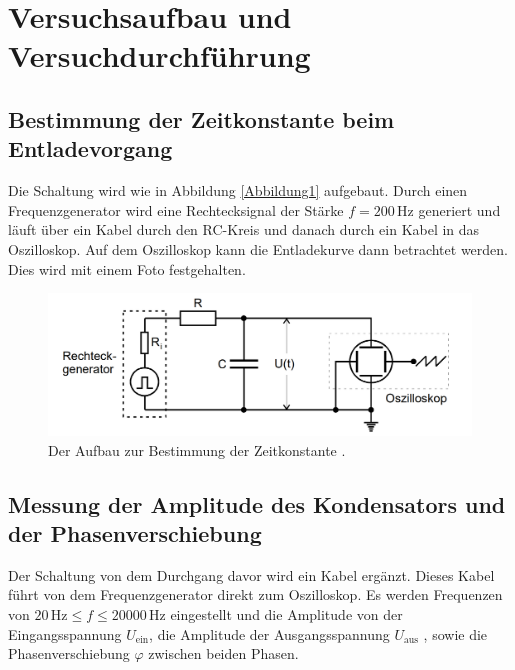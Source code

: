 \section{Versuchsaufbau und Versuchdurchführung}

\subsection{Bestimmung der Zeitkonstante beim Entladevorgang}

\begin{flushleft}
    Die Schaltung wird wie in Abbildung \ref{Abbildung1} aufgebaut. 
    Durch einen Frequenzgenerator wird eine Rechtecksignal der Stärke $f = 200\,\unit{\hertz} $ generiert und läuft über ein Kabel durch den RC-Kreis und danach durch ein Kabel in das Oszilloskop.
    Auf dem Oszilloskop kann die Entladekurve dann betrachtet werden. Dies wird mit einem Foto festgehalten.
\end{flushleft}

\begin{figure}[H]     
    \centering
    \includegraphics[width=140mm]{bilder/Abbildung1.png}
    \caption{Der Aufbau zur Bestimmung der Zeitkonstante \cite{a1}.\label{Abbildung2} }
\end{figure}

\subsection{Messung der Amplitude des Kondensators und der Phasenverschiebung}

\begin{flushleft}
    Der Schaltung von dem Durchgang davor wird ein Kabel ergänzt. 
    Dieses Kabel führt von dem Frequenzgenerator direkt zum Oszilloskop.
    Es werden Frequenzen von  $ 20\,\unit{\hertz} \leq f \leq 20000\,\unit{\hertz} $ eingestellt und die Amplitude von der Eingangsspannung $U_{\text{ein}}$, die Amplitude der Ausgangsspannung $U_{\text{aus}}$ , sowie die Phasenverschiebung $\varphi$ zwischen beiden Phasen.
\end{flushleft}

